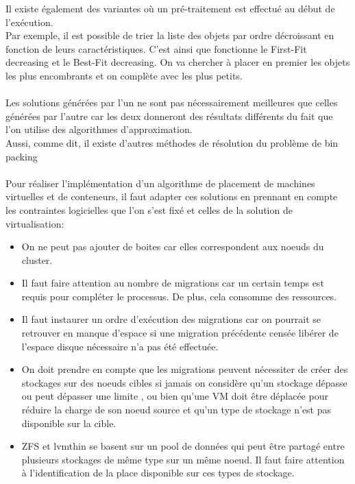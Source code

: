\documentclass[14pt]{extarticle}
\begin{document}
    \noindent
    Il existe également des variantes où un pré-traitement est effectué au début de l'exécution.\\
    Par exemple, il est possible de trier la liste des objets par ordre décroissant en fonction de leurs caractéristiques. C'est ainsi que fonctionne le First-Fit decreasing et le Best-Fit decreasing. On va chercher à placer en premier les objets les plus encombrants et on complète avec les plus petits.\\
    \\
    Les solutions générées par l'un ne sont pas nécessairement meilleures que celles générées par l'autre car les deux donneront des résultats différents du fait que l'on utilise des algorithmes d'approximation.\\
    Aussi, comme dit, il existe d'autres méthodes de résolution du problème de bin packing \cite{bin_pack_wiki_algos}\\
    \\
    Pour réaliser l'implémentation d'un algorithme de placement de machines virtuelles et de conteneurs, il faut adapter ces solutions en prennant en compte les contraintes logicielles que l'on s'est fixé et celles de la solution de virtualisation:
    \begin{itemize}[nosep,label=\textendash]
        \item On ne peut pas ajouter de boites car elles correspondent aux noeuds du cluster.
        \item Il faut faire attention au nombre de migrations car un certain temps est requis pour compléter le processus. De plus, cela consomme des ressources.
        \item Il faut instaurer un ordre d'exécution des migrations car on pourrait se retrouver en manque d'espace si une migration précédente censée libérer de l'espace disque nécessaire n'a pas été effectuée.
        \item On doit prendre en compte que les migrations peuvent nécessiter de créer des stockages sur des noeuds cibles si jamais on considère qu'un stockage dépasse ou peut dépasser une limite \cite{linux_perf_fs}, ou bien qu'une VM doit être déplacée pour réduire la charge de son noeud source et qu'un type de stockage n'est pas disponible sur la cible.
        \item ZFS et lvmthin se basent sur un pool de données qui peut être partagé entre plusieurs stockages de même type sur un même noeud. Il faut faire attention à l'identification de la place disponible sur ces types de stockage.
    \end{itemize}
    \newpage
\end{document}
